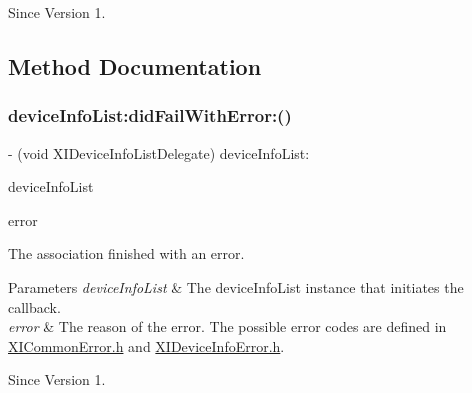 \begin{DoxySince}{Since}
Version 1. 
\end{DoxySince}


\subsection{Method Documentation}
\hypertarget{protocol_x_i_device_info_list_delegate_01-p_af5a6ce6f7dda877c7e3282a3f78ccafe}{}\label{protocol_x_i_device_info_list_delegate_01-p_af5a6ce6f7dda877c7e3282a3f78ccafe} 
\subsubsection{\texorpdfstring{device\+Info\+List\+:did\+Fail\+With\+Error\+:()}{deviceInfoList:didFailWithError:()}}
{\footnotesize\ttfamily -\/ (void X\+I\+Device\+Info\+List\+Delegate) device\+Info\+List\+: \begin{DoxyParamCaption}\item[{(id$<$ X\+I\+Device\+Info\+List $>$)}]{device\+Info\+List }\item[{didFailWithError:(N\+S\+Error $\ast$)}]{error }\end{DoxyParamCaption}}



The association finished with an error. 


\begin{DoxyParams}{Parameters}
{\em device\+Info\+List} & The device\+Info\+List instance that initiates the callback. \\
\hline
{\em error} & The reason of the error. The possible error codes are defined in \hyperlink{_x_i_common_error_8h}{X\+I\+Common\+Error.\+h} and \hyperlink{_x_i_device_info_error_8h}{X\+I\+Device\+Info\+Error.\+h}. \\
\hline
\end{DoxyParams}
\begin{DoxySince}{Since}
Version 1. 
\end{DoxySince}
\hypertarget{protocol_x_i_device_info_list_delegate_01-p_a7e959da1858b5767ad82a44926c9127b}{}\label{protocol_x_i_device_info_list_delegate_01-p_a7e959da1858b5767ad82a44926c9127b} 
